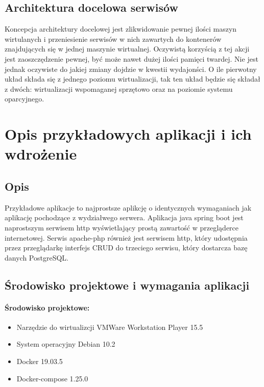 \documentclass[polish, a4paper, 12pt, oneside]{book}
\begin{document}
\section{Architektura docelowa serwisów}
Koncepcja architektury docelowej jest zlikwidowanie pewnej ilości maszyn wirtulanych i przeniesienie serwisów w nich zawartych do kontenerów znajdujących się w jednej maszynie wirtualnej. Oczywistą korzyścią z tej akcji jest zaoszczędzenie pewnej, być może nawet dużej ilości  pamięci twardej. Nie jest jednak oczywiste do jakiej zmiany dojdzie w kwestii wydajonści. O ile pierwotny układ składa się z jednego poziomu wirtualizacji, tak ten układ będzie się składał z dwóch: wirtualizacji wspomaganej sprzętowo oraz na poziomie systemu oparcyjnego.

\chapter{Opis przykładowych aplikacji i ich wdrożenie}
\section{Opis}
Przykładowe aplikacje to najprostsze aplikcję o identycznych wymaganiach jak aplikację pochodzące z wydziałwego serwera. Aplikacja java spring boot jest naprostszym serwisem http wyświetlający prostą zawartość w przegląderce internetowej. Serwis apache-php również jest serwisem http, który udostępnia przez przeglądarkę interfejs CRUD do trzeciego serwisu, który dostarcza bazę danych PostgreSQL.  
\section{Środowisko projektowe i wymagania aplikacji}
\subsubsection{Środowisko projektowe:}
\begin{itemize}[noitemsep]
    \item Narzędzie do wirtualizcji VMWare Workstation Player 15.5
    \item System operacyjny Debian 10.2
    \item Docker 19.03.5
    \item Docker-compose 1.25.0
\end{itemize}
\end{document}
